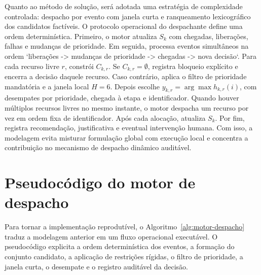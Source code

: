 \documentclass[
  12pt,
  oneside,
  a4paper,
  sumario=tradicional,
  brazil
]{abntex2}
\begin{document}
Quanto ao m\'etodo de solu\c{c}\~ao, ser\'a adotada uma estrat\'egia de complexidade controlada: despacho por evento com janela curta e ranqueamento lexicogr\'afico dos candidatos fact\'iveis. O protocolo operacional do despachante define uma ordem determin\'istica. Primeiro, o motor atualiza $S_k$ com chegadas, libera\c{c}\~oes, falhas e mudan\c{c}as de prioridade. Em seguida, processa eventos simult\^aneos na ordem `libera\c{c}\~oes -> mudan\c{c}as de prioridade -> chegadas -> nova decis\~ao`. Para cada recurso livre $r$, constr\'oi $C_{k,r}$. Se $C_{k,r} = \emptyset$, registra bloqueio expl\'icito e encerra a decis\~ao daquele recurso. Caso contr\'ario, aplica o filtro de prioridade mandat\'oria e a janela local $H=6$. Depois escolhe $y_{k,r} = \arg\max h_{k,r}(i)$, com desempates por prioridade, chegada \`a etapa e identificador. Quando houver m\'ultiplos recursos livres no mesmo instante, o motor despacha um recurso por vez em ordem fixa de identificador. Ap\'os cada aloca\c{c}\~ao, atualiza $S_k$. Por fim, registra recomenda\c{c}\~ao, justificativa e eventual interven\c{c}\~ao humana. Com isso, a modelagem evita misturar formula\c{c}\~ao global com execu\c{c}\~ao local e concentra a contribui\c{c}\~ao no mecanismo de despacho din\^amico audit\'avel.

\section{Pseudocódigo do motor de despacho}
Para tornar a implementa\c{c}\~ao reprodut\'ivel, o Algoritmo~\ref{alg:motor-despacho} traduz a modelagem anterior em um fluxo operacional execut\'avel. O pseudoc\'odigo explicita a ordem determin\'istica dos eventos, a forma\c{c}\~ao do conjunto candidato, a aplica\c{c}\~ao de restri\c{c}\~oes r\'igidas, o filtro de prioridade, a janela curta, o desempate e o registro audit\'avel da decis\~ao.
\end{document}
